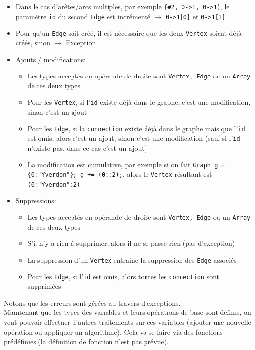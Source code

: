 \documentclass[french]{article}
\begin{document}
\begin{itemize}
\begin{itemize}
						\item Dans le cas d'arêtes/arcs multiples, par exemple \texttt{\{\#2, 0->1, 0->1\}}, le paramètre \texttt{id} du second \texttt{Edge} est incrémenté $\rightarrow$ \texttt{0->1[0]} et \texttt{0->1[1]}
						\item Pour qu'un \texttt{Edge} soit créé, il est nécessaire que les deux \texttt{Vertex} soient déjà créés, sinon $\rightarrow$ Exception
						\item Ajouts / modifications:
						\begin{itemize}
							\item Les types acceptés en opérande de droite sont \texttt{Vertex, Edge} ou un \texttt{Array} de ces deux types
							\item Pour les \texttt{Vertex}, si l'\texttt{id} existe déjà dans le graphe, c'est une modification, sinon c'est un ajout
							\item Pour les \texttt{Edge}, si la \texttt{connection} existe déjà dans le graphe mais que l'\texttt{id} est omis, alors c'est un ajout, sinon c'est une modification (sauf si l'\texttt{id} n'existe pas, dans ce cas c'est un ajout)
							\item La modification est cumulative, par exemple si on fait \texttt{Graph g = \{0:"Yverdon"\}; g += (0::2);}, alors le \texttt{Vertex} résultant est \texttt{(0:"Yverdon":2)}
						\end{itemize}
						\item Suppressions:
						\begin{itemize}
							\item Les types acceptés en opérande de droite sont \texttt{Vertex, Edge} ou un \texttt{Array} de ces deux types
							\item S'il n'y a rien à supprimer, alors il ne se passe rien (pas d'exception)
							\item La suppression d'un \texttt{Vertex} entraine la suppression des \texttt{Edge} associés
							\item Pour les \texttt{Edge}, si l'\texttt{id} est omis, alors toutes les \texttt{connection} sont supprimées
						\end{itemize}
					\end{itemize}
				\end{itemize}
				
				Notons que les erreurs sont gérées au travers d'exceptions.\\
				
				Maintenant que les types des variables et leurs opérations de base sont définis, on veut pouvoir effectuer d'autres traitements sur ces variables (ajouter une nouvelle opération ou appliquer un algorithme). Cela va se faire via des fonctions prédéfinies (la définition de fonction n'est pas prévue).\\
				
\end{document}
